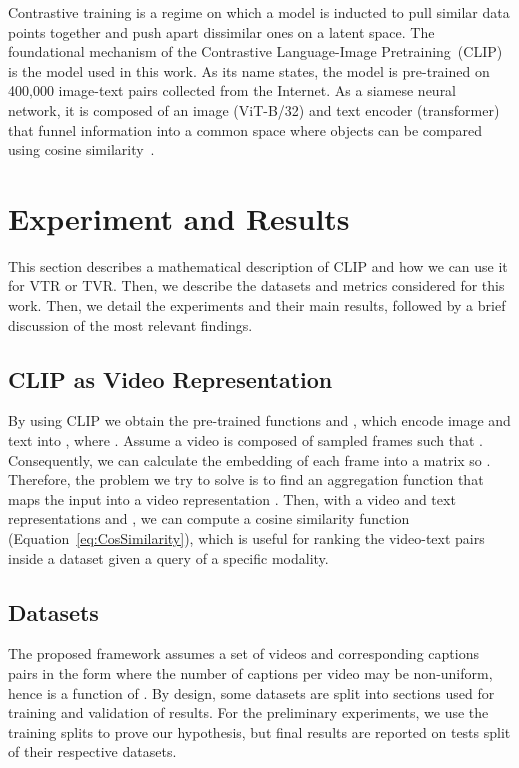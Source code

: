 \documentclass[a4paper,runningheads]{llncs}
\begin{document}
Contrastive training is a regime on which a model is inducted to pull similar data points together and push apart dissimilar ones on a latent space. The foundational mechanism of the Contrastive Language-Image Pretraining~(CLIP) is the model used in this work. As its name states, the model is pre-trained on 400,000 image-text pairs collected from the Internet. As a siamese neural network, it is composed of an image (ViT-B/32) and text encoder (transformer) that funnel information into a common space where objects can be compared using cosine similarity~\cite{Radford2021CLIP}.

\section{Experiment and Results}
\label{sec:Experiments}

This section describes a mathematical description of CLIP and how we can use it for VTR or TVR. Then, we describe the datasets and metrics considered for this work. Then, we detail the experiments and their main results, followed by a brief discussion of the most relevant findings.

\subsection{CLIP as Video Representation}
\label{subsec:Problem_Formulation}

By using CLIP we obtain the pre-trained functions  and , which encode image  and text  into , where . Assume a video  is composed of  sampled frames such that . Consequently, we can calculate the embedding of each frame into a matrix  so . Therefore, the problem we try to solve is to find an aggregation function  that maps the input   into a video representation . Then, with a video and text representations  and , we can compute a cosine similarity function (Equation~\ref{eq:CosSimilarity}), which is useful for ranking the video-text pairs inside a dataset given a query of a specific modality.



\subsection{Datasets}
\label{sec:Datasets}

The proposed framework assumes a set  of  videos and corresponding captions  pairs in the form  where the number of captions per video may be non-uniform, hence  is a function of . By design, some datasets are split into sections used for training and validation of results. For the preliminary experiments, we use the training splits to prove our hypothesis, but final results are reported on tests split of their respective datasets.
\end{document}
